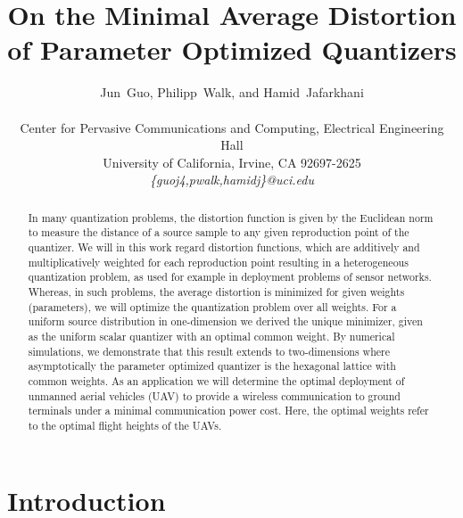 \documentclass[smallabstract,smallcaptions]{dccpaper}
\newcounter{example}[section]
\begin{document}
%
\title{On the Minimal Average Distortion of Parameter Optimized Quantizers}



\author{Jun~Guo, Philipp~Walk, and Hamid~Jafarkhani\\
  {\small\hspace{-0.5cm}\begin{minipage}{\textwidth}
\begin{tabular}{c}
Center for Pervasive Communications and Computing, Electrical Engineering Hall  \\
University of California, Irvine, CA 92697-2625 \\
{\it\{guoj4,pwalk,hamidj\}@uci.edu}
\end{tabular}
\end{minipage}\vspace{0.2cm}}
}

\maketitle
\begin{abstract}
  In many quantization problems, the distortion function is given by the Euclidean norm to measure the distance of a
  source sample to any given reproduction point of the quantizer. We will in this work regard distortion functions,
  which are additively and multiplicatively weighted for each reproduction point resulting in a heterogeneous quantization problem, as
  used for example in deployment problems of sensor networks. Whereas, in such problems, the average distortion is
  minimized for given weights (parameters), we will optimize the quantization problem over all weights.  For a uniform source
  distribution in one-dimension we derived the unique minimizer, given as the uniform scalar quantizer with an optimal
  common weight. By numerical simulations, we demonstrate that this result extends to two-dimensions where
  asymptotically the parameter optimized quantizer is the hexagonal lattice with common weights. As an application we
  will determine the optimal deployment of unmanned aerial vehicles (UAV) to provide a wireless communication to ground
  terminals under a minimal communication power cost. Here, the optimal weights refer to the optimal flight heights of the
  UAVs.
\end{abstract}
%
\section{Introduction}
\end{document}
